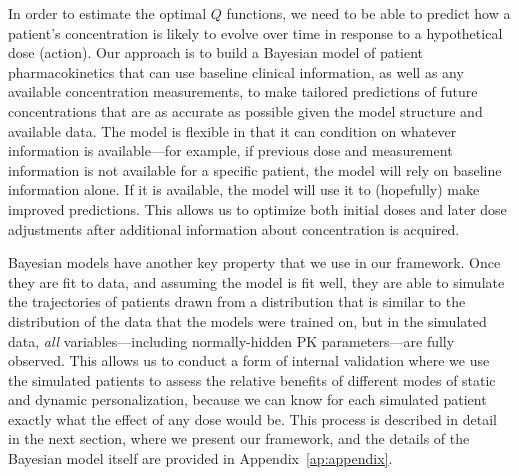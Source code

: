In order to estimate the optimal $Q$ functions, we need to be able to predict how a patient's concentration is likely to evolve over time in response to a hypothetical dose (action).  Our approach is to build a Bayesian model of patient pharmacokinetics that can use baseline clinical information, as well as any available concentration measurements, to make tailored predictions of future concentrations that are as accurate as possible given the model structure and available data. The model is flexible in that it can condition on whatever information is available---for example, if previous dose and measurement information is not available for a specific patient, the model will rely on baseline information alone. If it is available, the model will use it to (hopefully) make improved predictions. This allows us to optimize both initial doses and later dose adjustments after additional information about concentration is acquired.

Bayesian models have another key property that we use in our framework. Once they are fit to data, and assuming the model is fit well, they are able to simulate the trajectories of patients drawn from a distribution that is similar to the distribution of the data that the models were trained on, but in the simulated data, \textit{all} variables---including normally-hidden PK parameters---are fully observed. This allows us to conduct a form of internal validation where we use the simulated patients to assess the relative benefits of different modes of static and dynamic personalization, because we can know for each simulated patient exactly what the effect of any dose would be. This process is described in detail in the next section, where we present our framework, and the details of the Bayesian model itself are provided in Appendix~\ref{ap:appendix}.
